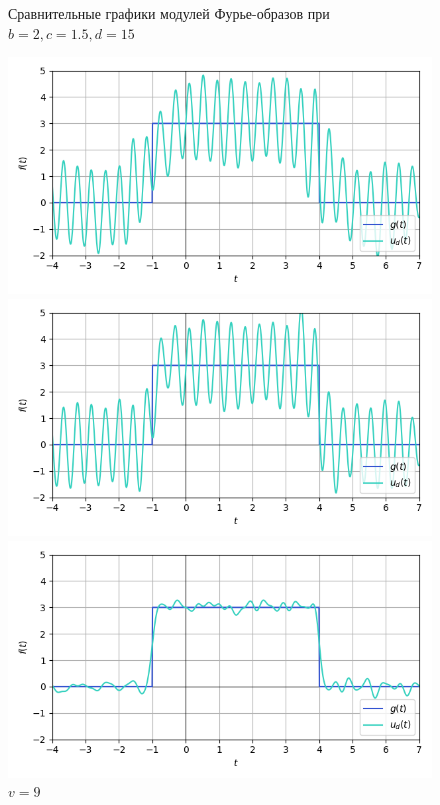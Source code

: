 \documentclass[a4paper]{article}
\begin{document}
\begin{figure}[H]
\begin{minipage}{0.33\textwidth}
        \caption{$v = 16$}
    \end{minipage}
    \caption*{Сравнительные графики модулей Фурье-образов при $b=2, c=1.5, d=15$}
\end{figure}
\begin{figure}[H]
    \begin{minipage}{0.33\textwidth}
        \centering \includegraphics[width=\textwidth]{sources/band-stop filter/denoised (b=2, c=1.5, d=15, v=5).png}
        \caption{$v = 5$}
    \end{minipage}\hfill
    \begin{minipage}{0.33\textwidth}
        \centering \includegraphics[width=\textwidth]{sources/band-stop filter/denoised (b=2, c=1.5, d=15, v=9).png}
        \caption{$v = 9$}
    \end{minipage}\hfill
    \begin{minipage}{0.33\textwidth}
        \centering \includegraphics[width=\textwidth]{sources/band-stop filter/denoised (b=2, c=1.5, d=15, v=16).png}

\end{minipage}
\end{figure}
\end{document}
